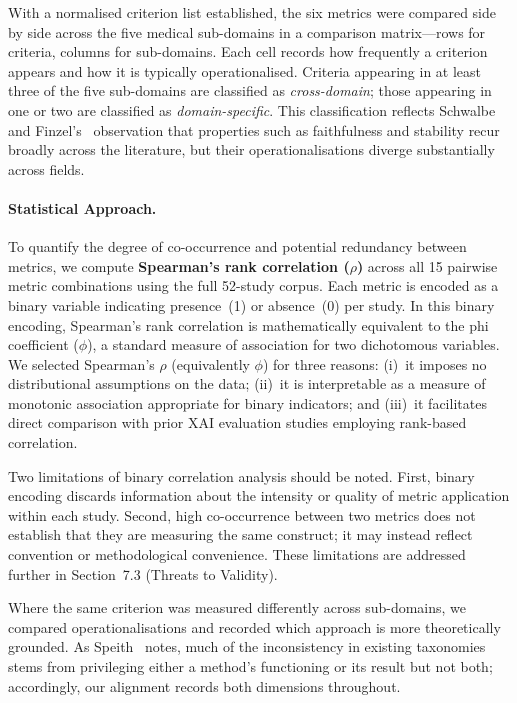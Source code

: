 With a normalised criterion list established, the six metrics were compared
side by side across the five medical sub-domains in a comparison matrix---rows
for criteria, columns for sub-domains. Each cell records how frequently a
criterion appears and how it is typically operationalised. Criteria appearing
in at least three of the five sub-domains are classified as
\emph{cross-domain}; those appearing in one or two are classified as
\emph{domain-specific}. This classification reflects Schwalbe and
Finzel's~\cite{schwalbe2024comprehensive} observation that properties such as
faithfulness and stability recur broadly across the literature, but their
operationalisations diverge substantially across fields.

\paragraph{Statistical Approach.}
To quantify the degree of co-occurrence and potential redundancy between metrics, we compute \textbf{Spearman's rank correlation ($\rho$)} across all 15 pairwise metric combinations using the full 52-study corpus. Each metric is encoded as a binary variable indicating presence~(1) or absence~(0) per study. In this binary encoding, Spearman's rank correlation is mathematically equivalent to the phi coefficient ($\phi$), a standard measure of association for two dichotomous variables. We selected Spearman's $\rho$ (equivalently $\phi$) for three reasons: (i)~it imposes no distributional assumptions on the data; (ii)~it is interpretable as a measure of monotonic association appropriate for binary indicators; and (iii)~it facilitates direct comparison with prior XAI evaluation studies employing rank-based correlation.

Two limitations of binary correlation analysis should be noted. First, binary encoding discards information about the intensity or quality of metric application within each study. Second, high co-occurrence between two metrics does not establish that they are measuring the same construct; it may instead reflect convention or methodological convenience. These limitations are addressed further in Section~7.3 (Threats to Validity).

Where the same criterion was measured differently across sub-domains, we compared operationalisations and recorded which approach is more theoretically grounded. As Speith~\cite{speith2022review} notes, much of the inconsistency in existing taxonomies stems from privileging either a method's functioning or its result but not both; accordingly, our alignment records both dimensions throughout.

